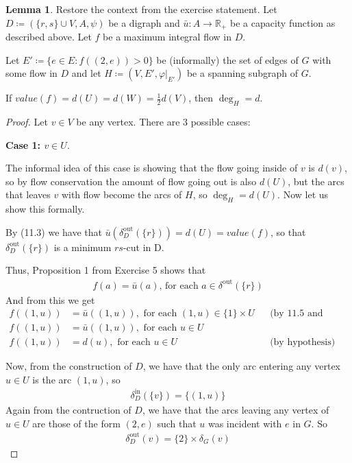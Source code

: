 \documentclass[a4paper,10pt, leqno]{article}
\newcommand{\restr}[1]{|_{#1}}
\theoremstyle{definition}
\begin{document}
\newtheorem{lemma}{Lemma}
\begin{lemma}
    Restore the context from the exercise statement. Let $D \coloneqq (\{r, s\} \cup V, A, \psi)$ be a digraph and $\bar{u} : A \to \mathbb{R}_+$ be a capacity function as described above. Let $f$ be a maximum integral flow in $D$.
    
    Let $E' \coloneqq \{e \in E : f((2, e)) > 0 \}$ be (informally) the set of edges of $G$ with some flow in $D$ and let $H \coloneqq (V, E', \varphi\restr{E'})$ be a spanning subgraph of $G$.
    
    If $value(f) = d(U) = d(W) = \frac{1}{2} d(V)$, then $\deg_H = d$.
    
\end{lemma}
\begin{proof}

Let $v \in V$ be any vertex. There are 3 possible cases:

\textbf{Case 1: $v \in U$}.

The informal idea of this case is showing that the flow going inside of $v$ is $d(v)$, so by flow conservation the amount of flow going out is also $d(U)$, but the arcs that leaves $v$ with flow become the arcs of $H$, so $\deg_H = d(U)$. Now let us show this formally.

By (11.3) we have that $\bar{u}(\delta_D^\text{out}(\{r\})) = d(U) = value(f)$, so that $\delta_D^\text{out}(\{r\})$ is a minimum $rs$-cut in D.

Thus, Proposition 1 from Exercise 5 shows that
\begin{align*}
 \tag{11.5}
f(a) = \bar{u}(a)\text{, for each }a \in \delta^{\text{out}}(\{r\})
\end{align*}
And from this we get
\begin{align*}
 f((1, u)) &= \bar{u}((1, u)), \text{ for each } (1, u) \in \{1\} \times U &&\text{(by 11.5 and 11.1)}\\
  f((1, u)) &= \bar{u}((1, u)), \text{ for each } u \in U \\
\tag{11.6}
 f((1, u)) &= d(u), \text{ for each } u \in U &&\text{(by hypothesis)} 
\end{align*}

Now, from the construction of $D$, we have that the only arc entering any vertex $u \in U$ is the arc $(1, u)$, so 
\begin{align*}
 \tag{11.7}
 \delta_D^{\text{in}}(\{v\}) = \{(1, u)\}
\end{align*}
Again from the contruction of $D$, we have that the arcs leaving any vertex of $u \in U$ are those of the form $(2, e)$ such that $u$ was incident with $e$ in $G$.
So 
\begin{align*}
 \tag{11.8}
 \delta_D^{\text{out}}(v) = \{2\} \times \delta_G(v)
\end{align*}


\end{proof}
\end{document}
